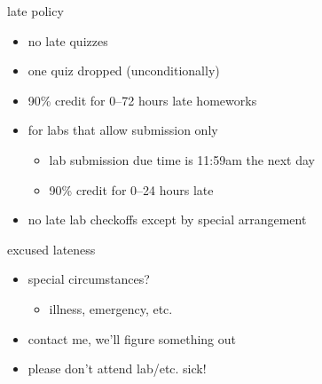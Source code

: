 
\begin{frame}{late policy}
    \begin{itemize}
    \item no late quizzes
    \item one quiz dropped (unconditionally)
    \vspace{.5cm}
    \item 90\% credit for 0--72 hours late homeworks
    \vspace{.5cm}
    \item for labs that allow submission only
        \begin{itemize}
        \item lab submission due time is 11:59am the next day
        \item 90\% credit for 0--24 hours late
        \end{itemize}
    \item no late lab checkoffs except by special arrangement
    \end{itemize}
\end{frame}


\begin{frame}{excused lateness}
    \begin{itemize}
    \item special circumstances?
        \begin{itemize}
        \item illness, emergency, etc.
        \end{itemize}
    \item contact me, we'll figure something out
    \vspace{.5cm}
    \item please don't attend lab/etc. sick!
    \end{itemize}
\end{frame}

